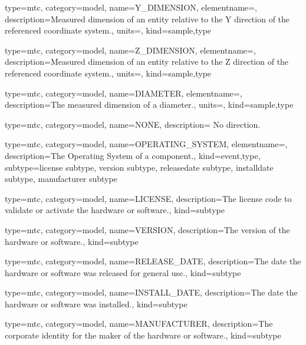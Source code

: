 {
  type=mtc,
  category=model,
  name={Y\_DIMENSION},
  elementname=,
  description={Measured dimension of an entity relative to the Y direction of the referenced coordinate system.},
  units=,
  kind={sample,type}
}


{
  type=mtc,
  category=model,
  name={Z\_DIMENSION},
  elementname=,
  description={Measured dimension of an entity relative to the Z direction of the referenced coordinate system.},
  units=,
  kind={sample,type}
}


{
  type=mtc,
  category=model,
  name={DIAMETER},
  elementname=,
  description={The measured dimension of a diameter.},
  units=,
  kind={sample,type}
}


{
  type=mtc,
  category=model,
  name={NONE},
  description={ No direction.}
}



{
  type=mtc,
  category=model,
  name={OPERATING\_SYSTEM},
  elementname=,
  description={The Operating System of a component.},
  kind={event,type},
  subtype={\gls{license subtype}, \gls{version subtype}, \gls{releasedate subtype}, \gls{installdate subtype}, \gls{manufacturer subtype}}
}


{
  type=mtc,
  category=model,
  name={LICENSE},
  description={The license code to validate or activate the hardware or software.},
  kind={subtype}
}


{
  type=mtc,
  category=model,
  name={VERSION},
  description={The version of the hardware or software.},
  kind={subtype}
}


{
  type=mtc,
  category=model,
  name={RELEASE\_DATE},
  description={The date the hardware or software was released for general use.},
  kind={subtype}
}


{
  type=mtc,
  category=model,
  name={INSTALL\_DATE},
  description={The date the hardware or software was installed.},
  kind={subtype}
}


{
  type=mtc,
  category=model,
  name={MANUFACTURER},
  description={The corporate identity for the maker of the hardware or software.},
  kind={subtype}
}


